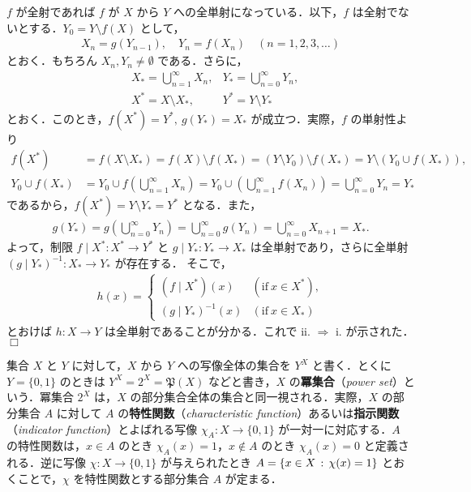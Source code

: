 \documentclass[pandoc,base=10pt,b5j,precisetext]{bxjsarticle}
\begin{document}
\(f\) が全射であれば \(f\) が \(X\) から \(Y\)
への全単射になっている．以下，\(f\)
は全射でないとする．\(Y_0 = Y \setminus f(X)\) として， \begin{align*}
X_n = g(Y_{n - 1}),\quad Y_n = f(X_n) \quad (n = 1, 2, 3, \dotsc)
\end{align*} とおく．もちろん \(X_n, Y_n \neq \emptyset\)
である．さらに， \begin{align*}
&X_* = \bigcup_{n = 1}^\infty X_n, &Y_* = \bigcup_{n = 0}^\infty Y_n,\\
&X^* = X \setminus X_*, &Y^* = Y \setminus Y_*
\end{align*} とおく．このとき，\(f(X^*) = Y^*,\ g(Y_*) = X_*\)
が成立つ．実際，\(f\) の単射性より \begin{align*}
f(X^*) &= f(X \setminus X_*) = f(X) \setminus f(X_*) = (Y \setminus Y_0) \setminus f(X_*) = Y \setminus (Y_0 \cup f(X_*)),\\
Y_0 \cup f(X_*) &= Y_0 \cup f( \bigcup_{n = 1}^\infty X_n ) = Y_0 \cup \left( \bigcup_{n = 1}^\infty f(X_n) \right) = \bigcup_{n = 0}^\infty Y_n = Y_*
\end{align*} であるから，\(f(X^*) = Y \setminus Y_* = Y^*\)
となる．また， \begin{align*}
g(Y_*) = g( \bigcup_{n = 0}^\infty Y_n) = \bigcup_{n = 0}^\infty g(Y_n) = \bigcup_{n = 0}^\infty X_{n + 1} = X_*.
\end{align*} よって，制限 \(f \mid X^* \colon X^* \to Y^*\) と
\(g \mid Y_* \colon Y_* \to X_*\) は全単射であり，さらに全単射
\((g \mid Y_*)^{-1} \colon X_* \to Y_*\) が存在する． そこで，
\begin{align*}
h(x) = \left\{ \begin{array}{ll} (f \mid X^*)(x) & (\text{if}\ x \in X^*), \\ (g \mid Y_*)^{-1}(x) & (\text{if}\ x \in X_*) \end{array} \right.
\end{align*} とおけば \(h \colon X \to Y\)
は全単射であることが分かる．これで ii. \(\Rightarrow\) i.
が示された．\(\Box\)

集合 \(X\) と \(Y\) に対して，\(X\) から \(Y\) への写像全体の集合を
\(Y^X\) と書く．とくに \(Y = \{ 0, 1 \}\) のときは
\(Y^X = 2^X = \mathfrak P(X)\) などと書き，\(X\)
の\textbf{冪集合}（\emph{power set}）という．冪集合 \(2^X\) は，\(X\)
の部分集合全体の集合と同一視される．実際，\(X\) の部分集合 \(A\)
に対して \(A\) の\textbf{特性関数}（\emph{characteristic
function}）あるいは\textbf{指示関数}（\emph{indicator
function}）とよばれる写像 \(\chi_A \colon X \to \{ 0, 1 \}\)
が一対一に対応する．\(A\) の特性関数は，\(x \in A\) のとき
\(\chi_A(x) = 1\)，\(x \notin A\) のとき \(\chi_A(x) = 0\)
と定義される．逆に写像 \(\chi \colon X \to \{ 0, 1 \}\) が与えられたとき
\(A = \{ x \in X \,:\, \chi(x) = 1 \}\) とおくことで，\(\chi\)
を特性関数とする部分集合 \(A\) が定まる．
\end{document}
